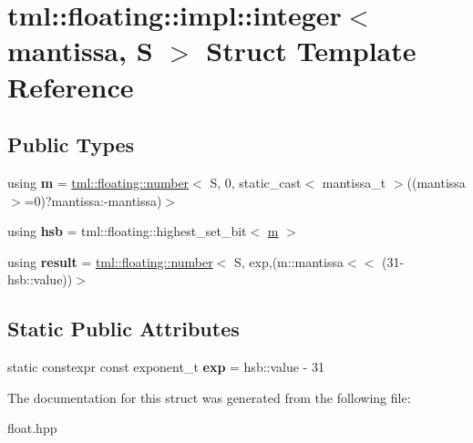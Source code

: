 \hypertarget{structtml_1_1floating_1_1impl_1_1integer}{\section{tml\+:\+:floating\+:\+:impl\+:\+:integer$<$ mantissa, S $>$ Struct Template Reference}
\label{structtml_1_1floating_1_1impl_1_1integer}
}
\subsection*{Public Types}
\begin{DoxyCompactItemize}
\item 
\hypertarget{structtml_1_1floating_1_1impl_1_1integer_a5ef5bc40d04f5702300c052fce5bd237}{using {\bfseries m} = \hyperlink{structtml_1_1floating_1_1number}{tml\+::floating\+::number}$<$ S, 0, static\+\_\+cast$<$ mantissa\+\_\+t $>$((mantissa $>$=0)?mantissa\+:-\/mantissa)$>$}\label{structtml_1_1floating_1_1impl_1_1integer_a5ef5bc40d04f5702300c052fce5bd237}

\item 
\hypertarget{structtml_1_1floating_1_1impl_1_1integer_aa1dabc3307b327d21176e79806debdc9}{using {\bfseries hsb} = tml\+::floating\+::highest\+\_\+set\+\_\+bit$<$ \hyperlink{structtml_1_1floating_1_1number}{m} $>$}\label{structtml_1_1floating_1_1impl_1_1integer_aa1dabc3307b327d21176e79806debdc9}

\item 
\hypertarget{structtml_1_1floating_1_1impl_1_1integer_a398c861b974aa3535e4b0e66c67b278d}{using {\bfseries result} = \hyperlink{structtml_1_1floating_1_1number}{tml\+::floating\+::number}$<$ S, exp,(m\+::mantissa$<$$<$ (31-\/hsb\+::value))$>$}\label{structtml_1_1floating_1_1impl_1_1integer_a398c861b974aa3535e4b0e66c67b278d}

\end{DoxyCompactItemize}
\subsection*{Static Public Attributes}
\begin{DoxyCompactItemize}
\item 
\hypertarget{structtml_1_1floating_1_1impl_1_1integer_a7bf180e8297682ae8ff966078d2ea84d}{static constexpr const exponent\+\_\+t {\bfseries exp} = hsb\+::value -\/ 31}\label{structtml_1_1floating_1_1impl_1_1integer_a7bf180e8297682ae8ff966078d2ea84d}

\end{DoxyCompactItemize}


The documentation for this struct was generated from the following file\+:\begin{DoxyCompactItemize}
\item 
float.\+hpp\end{DoxyCompactItemize}
